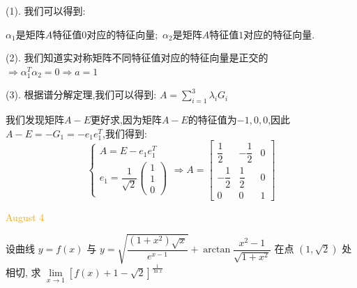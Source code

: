 \begin{solution}

	(1). 我们可以得到:  
	
	$\alpha_{1}$是矩阵$A$特征值$0$对应的特征向量;\ $\alpha_{2}$是矩阵$A$特征值$1$对应的特征向量.
	
	(2). 我们知道实对称矩阵不同特征值对应的特征向量是正交的$\Rightarrow \alpha_{1}^{T}\alpha_{2}=0\Rightarrow a=1$
	
	(3). 根据谱分解定理,我们可以得到:  $A=\sum\limits_{i=1}^{3}\lambda_{i}G_{i}$
	
	我们发现矩阵$A-E$更好求,因为矩阵$A-E$的特征值为$-1,0,0$,因此$A-E=-G_{1}=-e_{1}e_{1}^{T}$,我们得到:  
	$$\left\lbrace
	\begin{array}{l}
		A=E-e_{1}e_{1}^{T}\\
		e_{1}=\dfrac{1}{\sqrt{2}}\left( \begin{matrix}
			1\\1\\0
		\end{matrix}\right) 
	\end{array}
	\right. \Rightarrow A=\left[ \begin{matrix}
		\dfrac{1}{2}&-\dfrac{1}{2}&0\\
		-\dfrac{1}{2}&\dfrac{1}{2}&0\\
		0&0&1
	\end{matrix}\right] $$
\end{solution}


\textcolor{orange}{August 4}

\begin{example}[][Exam: 34.1.7]
	设曲线 $y=f(x)$ 与 $y=\sqrt{\dfrac{(1+x^2)\sqrt{x}}{e^{x-1}}}+\arctan\dfrac{x^2-1}{\sqrt{1+x^2}}$ 在点 $(1,\sqrt{2})$ 处相切,
	求 $\lim\limits_{x\to 1}[f(x)+1-\sqrt{2}]^{\frac{1}{\ln x}}$
\end{example}

